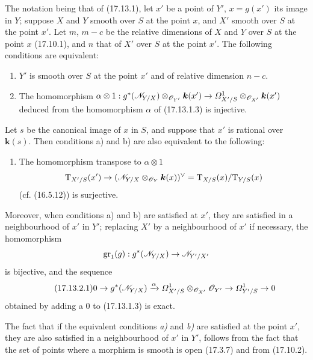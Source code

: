 \begin{proposition}[17.13.2]
\label{IV.17.13.2}
The notation being that of \textup{(17.13.1)}, let $x'$ be a point of $Y'$, $x=g(x')$ its image in $Y$; suppose $X$ and $Y$ smooth over $S$ at the point $x$, and $X'$ smooth over $S$ at the point $x'$. Let $m$, $m-c$ be the relative dimensions of $X$ and $Y$ over $S$ at the point $x$ \textup{(17.10.1)}, and $n$ that of $X'$ over $S$ at the point $x'$. The following conditions are equivalent:
\begin{enumerate}
  \item[\textup{a)}] $Y'$ is smooth over $S$ at the point $x'$ and of relative dimension $n-c$.
  \item[\textup{b)}] The homomorphism $\alpha\otimes1:g^*(\mathscr{N}_{Y/X})\otimes_{\mathscr{O}_{Y'}}\boldsymbol{k}(x')\to\varOmega^1_{X'/S}\otimes_{\mathscr{O}_{X'}}\boldsymbol{k}(x')$ deduced from the homomorphism $\alpha$ of \textup{(17.13.1.3)} is injective.
\end{enumerate}
Let $s$ be the canonical image of $x$ in $S$, and suppose that $x'$ is rational over $\boldsymbol{k}(s)$. Then conditions \textup{a)} and \textup{b)} are also equivalent to the following:
\begin{enumerate}
  \item[\textup{b$'$)}] The homomorphism transpose to $\alpha\otimes1$
  \[
  \mathrm{T}_{X'/S}(x')\to(\mathscr{N}_{Y/X}\otimes_{\mathscr{O}_Y}\boldsymbol{k}(x))^\vee=\mathrm{T}_{X/S}(x)/\mathrm{T}_{Y/S}(x)
  \]
  \textup{(cf. (16.5.12))} is surjective.
\end{enumerate}
Moreover, when conditions \textup{a)} and \textup{b)} are satisfied at $x'$,  they are satisfied in a neighbourhood of $x'$ in $Y'$; replacing $X'$ by a neighbourhood of $x'$ if necessary, the homomorphism
\[
\operatorname{gr}_1(g):g^*(\mathscr{N}_{Y/X})\to\mathscr{N}_{Y'/X'}
\]
is bijective, and the sequence
\[
\label{IV.17.13.2.1}
\tag{17.13.2.1}
0\to g^*(\mathscr{N}_{Y/X})\xrightarrow{\alpha}\varOmega^1_{X'/S}\otimes_{\mathscr{O}_{X'}}\mathscr{O}_{Y'}\to\varOmega^1_{Y'/S}\to0
\]
obtained by adding a $0$ to \textup{(17.13.1.3)} is exact.
\end{proposition}

The fact that if the equivalent conditions \emph{a)} and \emph{b)} are satisfied at the point $x'$, they are also satisfied in a neighbourhood of $x'$ in $Y'$, follows from the fact that the set of points where a morphism is smooth is open (17.3.7) and from (17.10.2).

